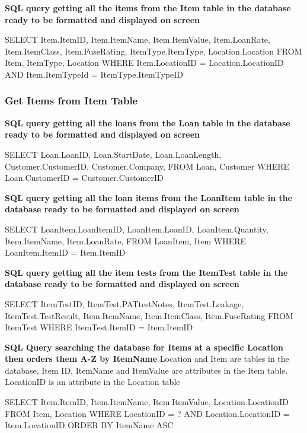 \textbf{SQL query getting all the items from the Item table in the database ready to be formatted and displayed on screen}

\begin{sql}
      SELECT
      Item.ItemID,
      Item.ItemName,
      Item.ItemValue,
      Item.LoanRate,
      Item.ItemClass,
      Item.FuseRating,
      ItemType.ItemType,
      Location.Location
      FROM Item, ItemType, Location
      WHERE Item.LocationID = Location.LocationID AND Item.ItemTypeId = ItemType.ItemTypeID
\end{sql}

\subsubsection{Get Items from Item Table}

\textbf{SQL query getting all the loans from the Loan table in the database ready to be formatted and displayed on screen}

\begin{sql}
    SELECT
    Loan.LoanID,
    Loan.StartDate,
    Loan.LoanLength,
    Customer.CustomerID,
    Customer.Company,
    FROM Loan, Customer
    WHERE Loan.CustomerID = Customer.CustomerID
\end{sql}

\textbf{SQL query getting all the loan items from the LoanItem table in the database ready to be formatted and displayed on screen}

\begin{sql}
    SELECT
    LoanItem.LoanItemID,
    LoanItem.LoanID,
    LoanItem.Quantity,
    Item.ItemName,
    Item.LoanRate,
    FROM LoanItem, Item
    WHERE LoanItem.ItemID = Item.ItemID
\end{sql}

\textbf{SQL query getting all the item tests from the ItemTest table in the database ready to be formatted and displayed on screen}

\begin{sql}
      SELECT
      ItemTestID, 
      ItemTest.PATtestNotes,
      ItemTest.Leakage,
      ItemTest.TestResult,
      Item.ItemName,
      Item.ItemClass,
      Item.FuseRating
      FROM ItemTest
      WHERE ItemTest.ItemID = Item.ItemID
\end{sql}

\textbf{SQL Query searching the database for Items at a specific Location then orders them A-Z by ItemName}
Location and Item are tables in the database, Item ID, ItemName and ItemValue are attributes in the Item table. LocationID is an attribute in the Location table
\begin{sql}
    SELECT 
    Item.ItemID,
    Item.ItemName,
    Item.ItemValue,
    Location.LocationID
    FROM Item, Location
    WHERE LocationID = ? AND
    Location.LocationID = Item.LocationID
    ORDER BY ItemName ASC
\end{sql}

